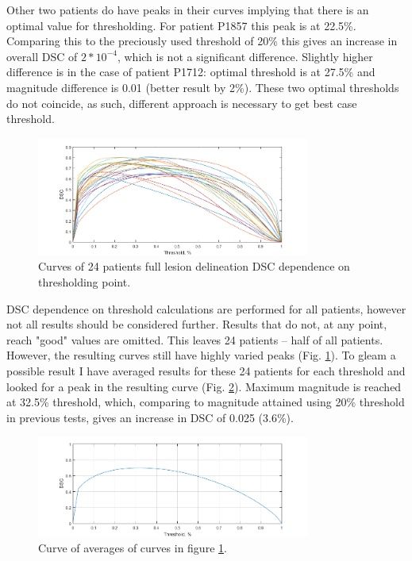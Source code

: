 \documentclass[12pt]{article}
\begin{document}
Other two patients do have peaks in their curves implying that there is an optimal value for thresholding.  For patient P1857 this peak is at 22.5\%. Comparing this to the preciously used threshold of 20\% this gives an increase in overall DSC of $2*10^{-4}$, which is not a significant difference. Slightly higher difference is in the case of patient P1712: optimal threshold is at 27.5\% and magnitude difference is 0.01 (better result by 2\%). These two optimal thresholds do not coincide, as such, different approach is necessary to get best case threshold.

\begin{figure}[!htb]
\centering
\includegraphics[width=0.8\textwidth]{img/cutoff/06cutofftest}
\caption{Curves of 24 patients full lesion delineation DSC dependence on thresholding point.}
\label{fig:ctfcurves}
\end{figure}

DSC dependence on threshold calculations are performed for all patients, however not all results should be considered further. Results that do not, at any point, reach "good" values \cite{griffis2016voxel} are omitted. This leaves 24 patients – half of all patients. However, the resulting curves still have highly varied peaks (Fig. \ref{fig:ctfcurves}). To gleam a possible result I have averaged results for these 24 patients for each threshold and looked for a peak in the resulting curve (Fig. \ref{fig:ctfsum}). Maximum magnitude is reached at 32.5\% threshold, which, comparing to magnitude attained using 20\% threshold in previous tests, gives an increase in DSC of 0.025 (3.6\%).

\begin{figure}[!htb]
\centering
\includegraphics[width=0.8\textwidth]{img/cutoff/06ctfsum}
\caption{Curve of averages of curves in figure \ref{fig:ctfcurves}.}
\label{fig:ctfsum}
\end{figure}
\end{document}
